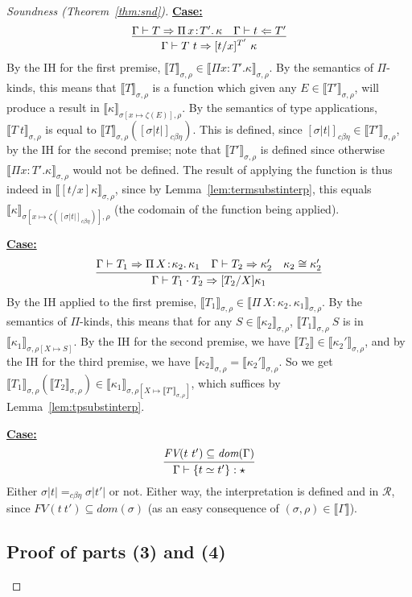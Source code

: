 \documentclass{article}
\newcommand{\choice}[0]{\zeta}
\newcommand{\abs}[4]{{#1}\, #2\! : \! #3.\, #4}
\newcommand{\interp}[1]{\llbracket #1 \rrbracket}
\newcommand{\tpcheck}[0]{\Leftarrow}
\newcommand{\tpsynth}[0]{\Rightarrow}
\newcommand{\cbe}[0]{c\beta\eta}
\newcommand{\startcase}[1]{\vspace{#1} \noindent\textbf{\underline{Case:}}}
\begin{document}
\begin{proof}[Soundness (Theorem~\ref{thm:snd})]
\startcase{.2cm}
\[
   \infer{\Gamma\vdash T\ t \tpsynth [t/x]^{T'}\ \kappa}{\Gamma\vdash T \tpsynth
     \abs{\Pi}{x}{T'}{\kappa} & \Gamma\vdash t \tpcheck T'}  
\]
By the IH for the first premise,
$\interp{T}_{\sigma,\rho}\in\interp{\Pi x:T'.\kappa}_{\sigma,\rho}$.
By the semantics of $\Pi$-kinds, this means that
$\interp{T}_{\sigma,\rho}$ is a function which given any
$E\in\interp{T'}_{\sigma,\rho}$, will produce a result in
$\interp{\kappa}_{\sigma[x\mapsto \choice(E)],\rho}$.  By the
semantics of type applications, $\interp{T\ t}_{\sigma,\rho}$ is equal
to $\interp{T}_{\sigma,\rho}([\sigma |t|]_{\cbe})$.  This is defined,
since $[\sigma |t|]_{\cbe}\in\interp{T'}_{\sigma,\rho}$, by the IH for
the second premise; note that $\interp{T'}_{\sigma,\rho}$ is defined
since otherwise $\interp{\Pi x:T'.\kappa}_{\sigma,\rho}$ would not be defined.
The result of applying the function is thus indeed
in $\interp{[t/x]\kappa}_{\sigma,\rho}$, since by
Lemma~\ref{lem:termsubstinterp}, this equals
$\interp{\kappa}_{\sigma[x\mapsto \choice([\sigma |t|]_{\cbe})],\rho}$
(the codomain of the function being applied).

\startcase{.2cm}
\[
  \infer{\Gamma\vdash T_1 \cdot T_2 \tpsynth [T_2/X]\kappa_1}{\Gamma\vdash T_1 \tpsynth \abs{\Pi}{X}{\kappa_2}{\kappa_1} & \Gamma\vdash T_2 \tpsynth \kappa_2' & \kappa_2 \cong \kappa_2'}
\]
By the IH applied to the first premise,
$\interp{T_1}_{\sigma,\rho}\in\interp{\abs{\Pi}{X}{\kappa_2}{\kappa_1}}_{\sigma,\rho}$.
By the semantics of $\Pi$-kinds, this means that for any
$S\in\interp{\kappa_2}_{\sigma,\rho}$, $\interp{T_1}_{\sigma,\rho}\ S$ is in
$\interp{\kappa_1}_{\sigma,\rho[X\mapsto S]}$.  By the IH for the second premise, we have 
$\interp{T_2} \in \interp{\kappa_2'}_{\sigma,\rho}$, and by the IH for the third premise,
we have $\interp{\kappa_2}_{\sigma,\rho} = \interp{\kappa_2'}_{\sigma,\rho}$.  So
we get $\interp{T_1}_{\sigma,\rho}(\interp{T_2}_{\sigma,\rho})\in \interp{\kappa_1}_{\sigma,\rho[X\mapsto \interp{T'}_{\sigma,\rho}]}$,
which suffices by Lemma~\ref{lem:tpsubstinterp}.

\startcase{.2cm}
\[
    \infer{\Gamma\vdash \{ t \simeq t' \} : \star}{\textit{FV}(t\ t')\subseteq\textit{dom}(\Gamma)}
\]
Either $\sigma |t| =_{\cbe} \sigma |t'|$ or not.  Either way, the interpretation is defined and in $\mathcal{R}$, since
$\textit{FV}(t\ t')\subseteq\textit{dom}(\sigma)$ (as an easy consequence of $(\sigma,\rho)\in\interp{\Gamma}$).

\subsection{Proof of parts (3) and (4)}


\end{proof}
\end{document}
